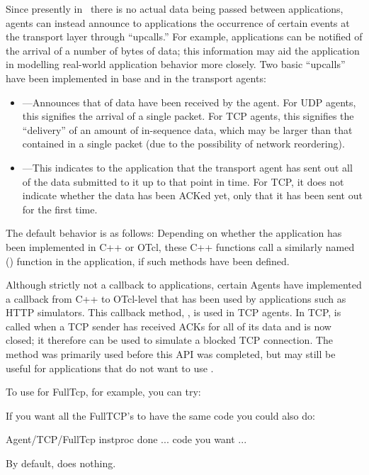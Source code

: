 Since presently in \ns~there is no actual data being passed between 
applications, agents can instead announce to applications the occurrence of 
certain events at the transport layer through ``upcalls.''  For example,
applications can be notified of the arrival of a number of bytes of data;
this information may aid the application in modelling real-world application
behavior more closely.  Two basic ``upcalls'' have been implemented in 
base  and in the transport agents:
\begin{itemize} 
\item {}---Announces that  of data have been
received by the agent.  For UDP agents, this signifies the arrival of
a single packet.  For TCP agents, this signifies the ``delivery'' of an 
amount of in-sequence data, which may be larger than that contained in a 
single packet (due to the possibility of network reordering).
\item {}---This indicates to the application that the transport
agent has sent out all of the data submitted to it up to that point in time.  
For TCP, it does not indicate whether the data has been ACKed yet, only that
it has been sent out for the first time. 
\end{itemize}
The default behavior is as follows: 
Depending on whether the application has been implemented in C++ or OTcl, these
C++ functions 
call a similarly named () function in the application,
if such methods have been defined.   

Although strictly not a callback to applications, certain Agents have
implemented a callback from C++ to OTcl-level that has been used by 
applications such as HTTP simulators.  This callback method, ,
is used in TCP agents.  In TCP,  is called when a TCP sender 
has received ACKs for all of its data and is now closed; it therefore can
be used to simulate a blocked TCP connection.  The 
method was primarily used before this API was completed, but may still be
useful for applications that do not want to use .

To use  for FullTcp, for example, you can try:
If you want all the FullTCP's to have the same code you could also do:
\begin{program}
        Agent/TCP/FullTcp instproc done {} {
            ... code you want ...
        }
\end{program}
By default,  does nothing.

